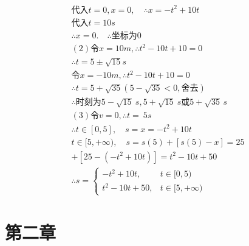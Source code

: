 \documentclass[blue, normal]{./templete/qyxfnote}
\begin{document}
\begin{multicols}{2}
\begin{gather*}
		\text{代入}t=0,x=0,\quad \therefore x=-t^2+10t\\
		\text{代入}t=10s\\
		\therefore x=0.\quad
		\therefore\text{坐标为}0\\
		(2)\text{令}x=10m,\therefore t^2-10t+10=0\\
		\therefore t=5\pm\sqrt{15}s\\
		\text{令}x=-10m,\therefore t^2-10t+10=0\\
		\therefore t=5+\sqrt{35}(5-\sqrt{35}<0,\text{舍去})\\
		\therefore\text{时刻为}5-\sqrt{15}\ s,5+\sqrt{15}\ s\text{或}5+\sqrt{35}\,s\\
		(3)\text{令}v=0,\therefore t=\ 5s\\
		\therefore t\in[0,5],\quad s=x=-t^2+10t\\
		t\in[5,+\infty),\quad s=s(5)+[s(5)-x]=25\\+[25-(-t^2+10t)]
		=t^2-10t+50\\
		\therefore s=
		\begin{cases}
		-t^2+10t,&t\in[0,5)\\
		t^2-10t+50,&t\in[5,+\infty)
		\end{cases}
		\end{gather*}
	

	
	\section{第二章}
	


\end{multicols}
\end{document}
